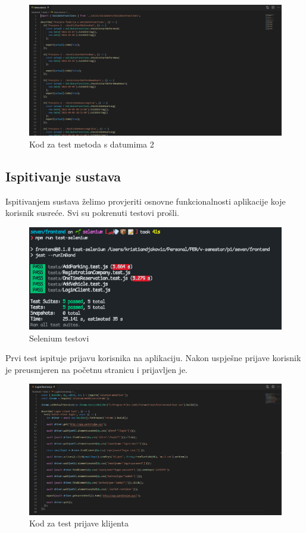 			\begin{figure}[H]
				\includegraphics[width=1\linewidth]{images/Times2.png}
				\caption{Kod za test metoda s datumima 2}
				\label{fig:Times - kod2} 
			\end{figure}
			
			\subsection{Ispitivanje sustava}
			
			Ispitivanjem sustava želimo provjeriti osnovne funkcionalnosti aplikacije koje korisnik susreće. Svi su pokrenuti testovi prošli.
			
				\begin{figure}[H]
				\includegraphics[width=1\linewidth]{images/SeleniumTests.png}
				\caption{Selenium testovi}
				\label{fig:Selenium tests} 
			\end{figure}
			
			Prvi test ispituje prijavu korisnika na aplikaciju. Nakon uspješne prijave korisnik je preusmjeren na početnu stranicu i prijavljen je.
			
			\begin{figure}[H]
				\includegraphics[width=1\linewidth]{images/LoginClient.png}
				\caption{Kod za test prijave klijenta}
				\label{fig:LoginClient test - kod} 
			\end{figure}
			
